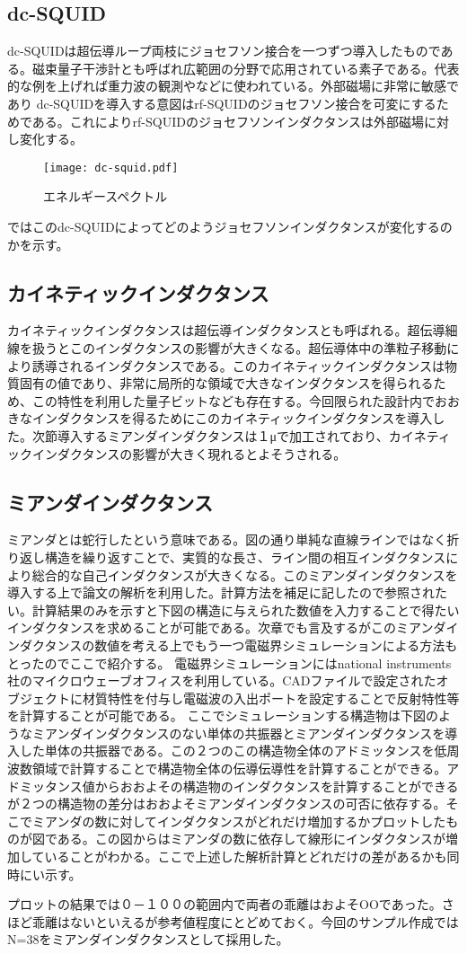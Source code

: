     \subsection{dc-SQUID}
        dc-SQUIDは超伝導ループ両枝にジョセフソン接合を一つずつ導入したものである。磁束量子干渉計とも呼ばれ広範囲の分野で応用されている素子である。代表的な例を上げれば重力波の観測やなどに使われている。外部磁場に非常に敏感であり
        dc-SQUIDを導入する意図はrf-SQUIDのジョセフソン接合を可変にするためである。これによりrf-SQUIDのジョセフソンインダクタンスは外部磁場に対し変化する。
        \begin{figure}[H]
            \centering
            \texttt{[image: dc-squid.pdf]}
            \caption{エネルギースペクトル}
        \end{figure}
        ではこのdc-SQUIDによってどのようジョセフソンインダクタンスが変化するのかを示す。
    \subsection{カイネティックインダクタンス}
        カイネティックインダクタンスは超伝導インダクタンスとも呼ばれる。超伝導細線を扱うとこのインダクタンスの影響が大きくなる。超伝導体中の準粒子移動により誘導されるインダクタンスである。このカイネティックインダクタンスは物質固有の値であり、非常に局所的な領域で大きなインダクタンスを得られるため、この特性を利用した量子ビットなども存在する。今回限られた設計内でおおきなインダクタンスを得るためにこのカイネティックインダクタンスを導入した。次節導入するミアンダインダクタンスは１μで加工されており、カイネティックインダクタンスの影響が大きく現れるとよそうされる。
    \subsection{ミアンダインダクタンス}
        ミアンダとは蛇行したという意味である。図の通り単純な直線ラインではなく折り返し構造を繰り返すことで、実質的な長さ、ライン間の相互インダクタンスにより総合的な自己インダクタンスが大きくなる。このミアンダインダクタンスを導入する上で論文の解析を利用した。計算方法を補足に記したので参照されたい。計算結果のみを示すと下図の構造に与えられた数値を入力することで得たいインダクタンスを求めることが可能である。次章でも言及するがこのミアンダインダクタンスの数値を考える上でもう一つ電磁界シミュレーションによる方法もとったのでここで紹介する。
        電磁界シミュレーションにはnational instruments社のマイクロウェーブオフィスを利用している。CADファイルで設定されたオブジェクトに材質特性を付与し電磁波の入出ポートを設定することで反射特性等を計算することが可能である。
        ここでシミュレーションする構造物は下図のようなミアンダインダクタンスのない単体の共振器とミアンダインダクタンスを導入した単体の共振器である。この２つのこの構造物全体のアドミッタンスを低周波数領域で計算することで構造物全体の伝導伝導性を計算することができる。アドミッタンス値からおおよその構造物のインダクタンスを計算することができるが２つの構造物の差分はおおよそミアンダインダクタンスの可否に依存する。そこでミアンダの数に対してインダクタンスがどれだけ増加するかプロットしたものが図である。この図からはミアンダの数に依存して線形にインダクタンスが増加していることがわかる。ここで上述した解析計算とどれだけの差があるかも同時にい示す。

        プロットの結果では０－１００の範囲内で両者の乖離はおよそOOであった。さほど乖離はないといえるが参考値程度にとどめておく。今回のサンプル作成ではN=38をミアンダインダクタンスとして採用した。